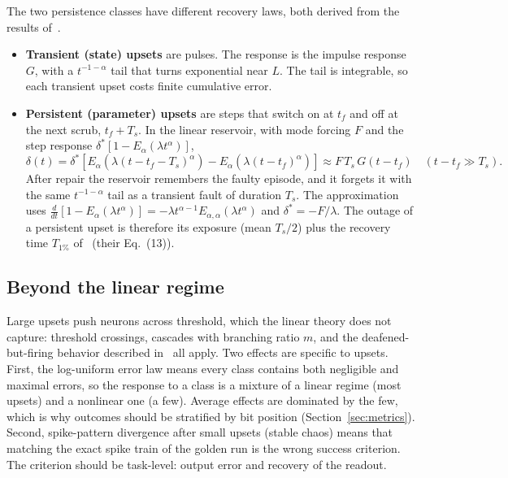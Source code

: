 \documentclass[11pt,a4paper]{article}
\begin{document}
The two persistence classes have different recovery laws, both derived from the results of~\cite{dropout2026}.
\begin{itemize}
  \item \textbf{Transient (state) upsets} are pulses. The response is the impulse response $G$, with a $t^{-1-\alpha}$ tail that turns exponential near $L$. The tail is integrable, so each transient upset costs finite cumulative error.
  \item \textbf{Persistent (parameter) upsets} are steps that switch on at $t_f$ and off at the next scrub, $t_f + T_s$. In the linear reservoir, with mode forcing $F$ and the step response $\delta^{*}[1 - E_\alpha(\lambda t^\alpha)]$,
  \begin{equation}
  \delta(t) = \delta^{*}\left[ E_\alpha\!\left(\lambda (t - t_f - T_s)^{\alpha}\right) - E_\alpha\!\left(\lambda (t-t_f)^{\alpha}\right) \right] \approx F\, T_s\, G(t - t_f) \quad (t - t_f \gg T_s).
  \label{eq:scrubtail}
  \end{equation}
  After repair the reservoir remembers the faulty episode, and it forgets it with the same $t^{-1-\alpha}$ tail as a transient fault of duration $T_s$. The approximation uses $\frac{d}{dt}[1 - E_\alpha(\lambda t^\alpha)] = -\lambda t^{\alpha-1}E_{\alpha,\alpha}(\lambda t^\alpha)$ and $\delta^{*} = -F/\lambda$. The outage of a persistent upset is therefore its exposure (mean $T_s/2$) plus the recovery time $T_{1\%}$ of~\cite{dropout2026} (their Eq.~(13)).
\end{itemize}

\subsection{Beyond the linear regime}

Large upsets push neurons across threshold, which the linear theory does not capture: threshold crossings, cascades with branching ratio $m$, and the deafened-but-firing behavior described in~\cite{dropout2026} all apply. Two effects are specific to upsets. First, the log-uniform error law means every class contains both negligible and maximal errors, so the response to a class is a mixture of a linear regime (most upsets) and a nonlinear one (a few). Average effects are dominated by the few, which is why outcomes should be stratified by bit position (Section~\ref{sec:metrics}). Second, spike-pattern divergence after small upsets (stable chaos) means that matching the exact spike train of the golden run is the wrong success criterion. The criterion should be task-level: output error and recovery of the readout.
\end{document}
